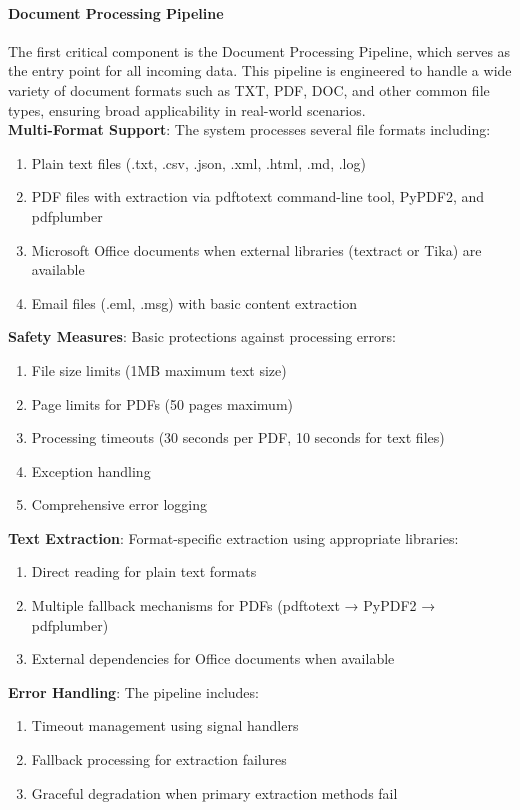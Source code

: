\documentclass[conference]{IEEEtran}
\begin{document}
\paragraph{\textbf{Document Processing Pipeline}}

The first critical component is the Document Processing Pipeline, which serves as the entry point for all incoming data. This pipeline is engineered to handle a wide variety of document formats such as TXT, PDF, DOC, and other common file types, ensuring broad applicability in real-world scenarios.
\\
\textbf{Multi-Format Support}: The system processes several file formats including:
\begin{enumerate}
\item Plain text files (.txt, .csv, .json, .xml, .html, .md, .log)
\item PDF files with extraction via pdftotext command-line tool, PyPDF2, and pdfplumber
\item Microsoft Office documents when external libraries (textract or Tika) are available
\item Email files (.eml, .msg) with basic content extraction
\end{enumerate}

\textbf{Safety Measures}: Basic protections against processing errors:
\begin{enumerate}
\item File size limits (1MB maximum text size)
\item Page limits for PDFs (50 pages maximum)
\item Processing timeouts (30 seconds per PDF, 10 seconds for text files)
\item Exception handling
\item Comprehensive error logging
\end{enumerate}

\textbf{Text Extraction}: Format-specific extraction using appropriate libraries:
\begin{enumerate}
\item Direct reading for plain text formats
\item Multiple fallback mechanisms for PDFs (pdftotext → PyPDF2 → pdfplumber)
\item External dependencies for Office documents when available
\end{enumerate}

\textbf{Error Handling}: The pipeline includes:
\begin{enumerate}
\item Timeout management using signal handlers
\item Fallback processing for extraction failures
\item Graceful degradation when primary extraction methods fail
\end{enumerate}
\end{document}
